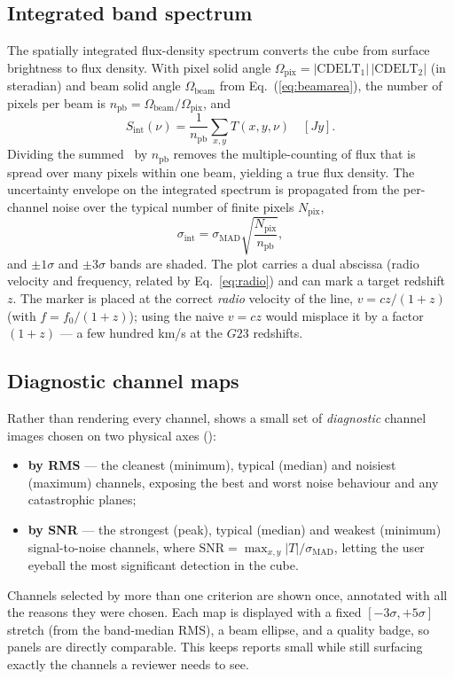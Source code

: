 \documentclass[11pt,a4paper]{article}
\begin{document}
\subsection{Integrated band spectrum}\label{sec:bandspec}
The spatially integrated flux-density spectrum converts the cube from surface
brightness to flux density. With pixel solid angle
$\Omega_{\mathrm{pix}} = |\mathrm{CDELT}_1|\,|\mathrm{CDELT}_2|$ (in steradian)
and beam solid angle $\Omega_{\mathrm{beam}}$ from Eq.~(\ref{eq:beamarea}), the
number of pixels per beam is $n_{\mathrm{pb}} = \Omega_{\mathrm{beam}}/\Omega_{\mathrm{pix}}$, and
\begin{equation}
  S_{\mathrm{int}}(\nu) = \frac{1}{n_{\mathrm{pb}}}\sum_{x,y} T(x,y,\nu)
  \quad[\si{Jy}].
  \label{eq:sint}
\end{equation}
Dividing the summed \jybeam\ by $n_{\mathrm{pb}}$ removes the multiple-counting
of flux that is spread over many pixels within one beam, yielding a true flux
density. The uncertainty envelope on the integrated spectrum is propagated from
the per-channel noise over the typical number of finite pixels $N_{\mathrm{pix}}$,
\begin{equation}
  \sigma_{\mathrm{int}} = \sigma_{\mathrm{MAD}}\sqrt{\frac{N_{\mathrm{pix}}}{n_{\mathrm{pb}}}},
\end{equation}
and $\pm1\sigma$ and $\pm3\sigma$ bands are shaded. The plot carries a dual
abscissa (radio velocity and frequency, related by Eq.~\ref{eq:radio}) and can
mark a target redshift $z$. The marker is placed at the correct \emph{radio}
velocity of the line, $v = cz/(1+z)$ (with $f = f_0/(1+z)$); using the naive
$v = cz$ would misplace it by a factor $(1+z)$ --- a few hundred \si{km/s} at the
$G23$ redshifts.

\subsection{Diagnostic channel maps}\label{sec:thumbs}
Rather than rendering every channel,  shows a small set of
\emph{diagnostic} channel images chosen on two physical axes
():
\begin{itemize}[noitemsep,topsep=2pt]
  \item \textbf{by RMS} --- the cleanest (minimum), typical (median) and
        noisiest (maximum) channels, exposing the best and worst noise
        behaviour and any catastrophic planes;
  \item \textbf{by SNR} --- the strongest (peak), typical (median) and weakest
        (minimum) signal-to-noise channels, where
        $\mathrm{SNR} = \max_{x,y}|T|/\sigma_{\mathrm{MAD}}$, letting the user
        eyeball the most significant detection in the cube.
\end{itemize}
Channels selected by more than one criterion are shown once, annotated with all
the reasons they were chosen. Each map is displayed with a fixed
$[-3\sigma, +5\sigma]$ stretch (from the band-median RMS), a beam ellipse, and a
quality badge, so panels are directly comparable. This keeps reports small while
still surfacing exactly the channels a reviewer needs to see.
\end{document}
